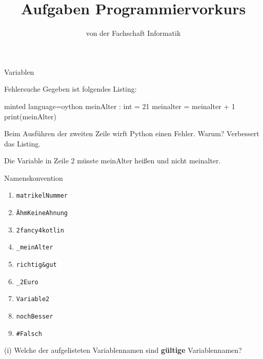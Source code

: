 
\title{Aufgaben Programmiervorkurs}
\subtitle{von der Fachschaft Informatik\hfill\ptitle}

\usepackage{enumitem}


\maketitle{}

\begin{task}[points=auto]{Variablen }
    \begin{subtask*}[points=0]{Fehlersuche}
        Gegeben ist folgendes Listing:
        \begin{codeBlock}[]{minted language=oython}
            meinAlter : int = 21
            meinalter = meinalter + 1
            print(meinAlter)
        \end{codeBlock}
        Beim Ausführen der zweiten Zeile wirft Python einen Fehler. Warum? Verbessert das Listing.
        \begin{solution}
            Die Variable in Zeile 2 müsste {\ttfamily meinAlter} heißen und nicht {\ttfamily meinalter}.
        \end{solution}
    \end{subtask*}
    \begin{subtask*}[points=0]{Namenskonvention}
        \begin{multicols}{3}
            \begin{enumerate}[label=(\alph*)]
                \item \texttt{matrikelNummer}
                \item \texttt{ÄhmKeineAhnung}
                \item \texttt{2fancy4kotlin}
                \item \texttt{_meinAlter}
                \item \texttt{richtig&gut}
                \item \texttt{_2Euro}
                \item \texttt{Variable2}
                \item \texttt{nochBesser}
                \item \texttt{#Falsch}
            \end{enumerate}
        \end{multicols}
        (i) Welche der aufgelisteten Variablennamen sind \textbf{gültige} Variablennamen?


\end{subtask*}
\end{task}
